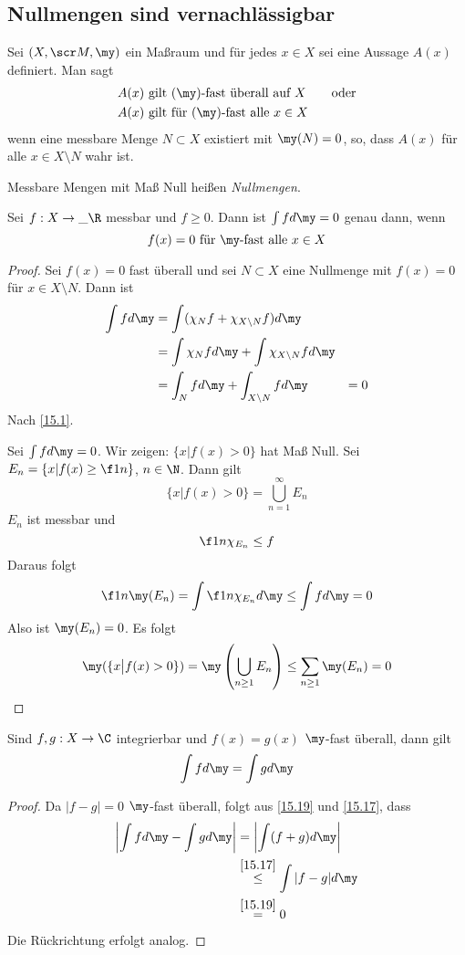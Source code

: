 \documentclass[a4paper,10pt]{scrartcl}
\begin{document}
\subsection{Nullmengen sind vernachlässigbar}

\begin{df*}
	Sei $(X, \scr M, \my)$ ein Maßraum und für jedes $x\in X$ sei eine Aussage $A(x)$ definiert.
	Man sagt
	\begin{align*}
		&A(x) \text{ gilt ($\my$)-fast überall auf $X$} \qquad \text{oder}\\
		&A(x) \text{ gilt für ($\my$)-fast alle $x\in X$}
	\end{align*}
	wenn eine messbare Menge $N\subset X$ existiert mit $\my(N) = 0$, so, dass $A(x)$ für alle $x\in X\setminus N$ wahr ist.

	Messbare Mengen mit Maß Null heißen \emph{Nullmengen}.
\end{df*}

\begin{thm}
	\label{15.19}
	Sei $f:X\to \_\R$ messbar und $f\ge 0$.
	Dann ist $\int fd\my = 0$ genau dann, wenn
	\[
		f(x) = 0 \text{ für $\my$-fast alle $x\in X$}
	\]
	\begin{proof}
		Sei $f(x)=0$ fast überall und sei $N\subset X$ eine Nullmenge mit $f(x)=0$ für $x\in X\setminus N$.
		Dann ist
		\begin{align*}
			\int fd\my &= \int (\chi_N f + \chi_{X\setminus N}f)d\my\\
								   &= \int \chi_N fd\my + \int \chi_{X\setminus N}fd\my\\
							 &=\int_N fd\my + \int_{X\setminus N}fd\my
			&=0
		\end{align*}
		Nach \ref{15.1}.

		Sei $\int fd\my = 0$.
		Wir zeigen: $\{x\big| f(x) > 0\}$ hat Maß Null.
		Sei $E_n = \{x| f(x) \ge \f 1n\}$, $n\in \N$.
		Dann gilt
		\[
			\{x\big| f(x) > 0\} = \bigcup_{n=1}^\infty E_n
		\]
		$E_n$ ist messbar und
		\[
			\f 1n \chi_{E_n} \le f
		\]
		Daraus folgt
		\[
			\f 1n \my(E_n) = \int \f 1n \chi_{E_n}d\my \le \int f d\my = 0
		\]
		Also ist $\my(E_n) = 0$.		
		Es folgt
		\[
			\my(\{x\big |f(x)>0\}) = \my\left( \bigcup_{n\ge 1}E_n\right) \le \sum_{n\ge 1} \my(E_n) = 0
		\]
	\end{proof}
\end{thm}


\begin{kor}
	\label{15.20}
	Sind $f,g:X\to \C$ integrierbar und $f(x)=g(x)$ $\my$-fast überall, dann gilt
	\[
		\int fd\my = \int gd\my
	\]
	\begin{proof}
		Da $|f-g|=0$ $\my$-fast überall, folgt aus \ref{15.19} und \ref{15.17}, dass
		\begin{align*}
			\left|\int fd\my - \int gd\my \right| &= \left| \int(f+g) d\my\right|\\
																																	  &\stackrel{\ref{15.17}}\le \int |f-g| d\my \\
																										   &\stackrel{\ref{15.19}}= 0
		\end{align*}
		Die Rückrichtung erfolgt analog.
	\end{proof}
\end{kor}
\end{document}
